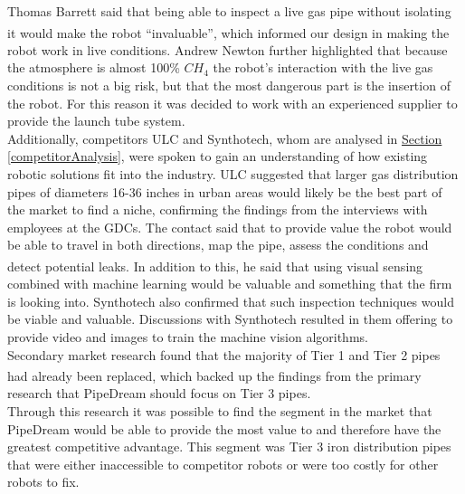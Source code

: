 \documentclass[11pt]{article}		%
\newcommand{\supercite}[1]{\textsuperscript{\cite{#1}}}		%
\newcommand{\sectref}[1]{\hyperref[#1]{Section \ref*{#1}}}     %
\begin{document}
            \hspace*{3ex}Thomas Barrett said that being able to inspect a live gas pipe without isolating it would make the robot “invaluable”\supercite{Barret}, which informed our design in making the robot work in live conditions. Andrew Newton further highlighted that because the atmosphere is almost 100\% ${CH}_4$ the robot’s interaction with the live gas conditions is not a big risk, but that the most dangerous part is the insertion of the robot. For this reason it was decided to work with an experienced supplier to provide the launch tube system.
	        \\
            \hspace*{3ex}Additionally, competitors ULC and Synthotech, whom are analysed in \sectref{competitorAnalysis}, were spoken to gain an understanding of how existing robotic solutions fit into the industry. ULC suggested that larger gas distribution pipes of diameters 16-36 inches in urban areas would likely be the best part of the market to find a niche, confirming the findings from the interviews with employees at the GDCs. The contact said that to provide value the robot would be able to travel in both directions, map the pipe, assess the conditions and detect potential leaks.\supercite{ULC_interview} In addition to this, he said that using visual sensing combined with machine learning would be valuable and something that the firm is looking into. Synthotech also confirmed that such inspection techniques would be viable and valuable. Discussions with Synthotech resulted in them offering to provide video and images to train the machine vision algorithms.
	        \\
            \hspace*{3ex}Secondary market research found that the majority of Tier 1 and Tier 2 pipes had already been replaced\supercite{SGN-GD2}, which backed up the findings from the primary research that PipeDream should focus on Tier 3 pipes. 
            \\
            \hspace*{3ex}Through this research it was possible to find the segment in the market that PipeDream would be able to provide the most value to and therefore have the greatest competitive advantage. This segment was Tier 3 iron distribution pipes that were either inaccessible to competitor robots or were too costly for other robots to fix.
\end{document}
